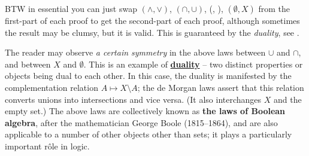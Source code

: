 \begin{note}
BTW in essential you can just swap \((\land, \lor)\), \((\cap, \cup)\), (, ), \((\emptyset, X)\) from the first-part of each proof to get the second-part of each proof, although sometimes the result may be clumsy, but it is valid. This is guaranteed by the \emph{duality}, see .
\end{note}

\begin{remark}
The reader may observe \emph{a certain symmetry} in the above laws between \(\cup\) and \(\cap\), and between \(X\) and \(\emptyset\). This is an example of \href{https://www.wikiwand.com/en/Duality_(mathematics)}{\textbf{duality}} -- two distinct properties or objects being dual to each other. In this case, the duality is manifested by the complementation relation \(A \mapsto X \setminus A \); the de Morgan laws assert that this relation converts unions into intersections and vice versa. (It also interchanges \(X\) and the empty set.) The above laws are collectively known as \textbf{the laws of Boolean algebra}, after the mathematician George Boole (1815–1864), and are also applicable to a number of other objects other than sets; it plays a
particularly important r\^{o}le in logic.
\end{remark}